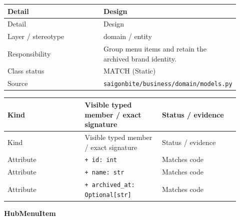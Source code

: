 \begin{longtable}{>{\raggedright\arraybackslash}p{0.4600\linewidth}>{\raggedright\arraybackslash}p{0.4600\linewidth}}
Detail & Design \\
\hline\endfirsthead
Detail & Design \\
\hline\endhead
Layer / stereotype & domain / \guillemotleft{}entity\guillemotright{} \\
Responsibility & Group menu items and retain the archived brand identity. \\
Class status & MATCH (Static) \\
Source & \texttt{saigonbite/\allowbreak{}business/\allowbreak{}domain/\allowbreak{}models.\allowbreak{}py} \\
\end{longtable}
\begin{longtable}{>{\raggedright\arraybackslash}p{0.3067\linewidth}>{\raggedright\arraybackslash}p{0.3067\linewidth}>{\raggedright\arraybackslash}p{0.3067\linewidth}}
Kind & Visible typed member / exact signature & Status / evidence \\
\hline\endfirsthead
Kind & Visible typed member / exact signature & Status / evidence \\
\hline\endhead
Attribute & \texttt{+ id: int} & Matches code \\
Attribute & \texttt{+ name: str} & Matches code \\
Attribute & \texttt{+ archived\_\allowbreak{}at: Optional[str]} & Matches code \\
\end{longtable}
\textbf{HubMenuItem}


